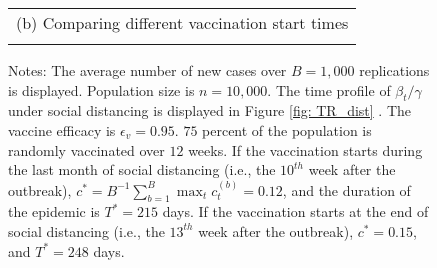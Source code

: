 \documentclass[12pt]{article}
\begin{document}
\begin{figure}[tp]
\begin{footnotesize}
\vspace{0.3cm}%


\begin{center}%
\begin{tabular}
[c]{c}%
(b) Comparing different vaccination start times%
\vspace{0.2cm}%
\\%
{\includegraphics[
height=1.9951in,
width=2.6524in
]%
{figs/theory_cmp_vacc_wbeg_dist_pct75_eff95_12W_dcT.png}%
}
\end{tabular}



\end{center}

%

\vspace{-0.2cm}%
Notes: The average number of new cases over $B=1,000$ replications is
displayed. Population size is $n=10,000$. The time profile of $\beta
_{t}/\gamma$ under social distancing is displayed in Figure \ref{fig: TR_dist}%
. The vaccine efficacy is $\epsilon_{v}=0.95$. $75$ percent of the population
is randomly vaccinated over $12$ weeks. If the vaccination starts during the
last month of social distancing (i.e., the $10^{th}$ week after the outbreak),
$c^{\ast}=B^{-1}\sum_{b=1}^{B}\max_{t}c_{t}^{(b)}=0.12$, and the duration of
the epidemic is $T^{\ast}=215$ days. If the vaccination starts at the end of
social distancing (i.e., the $13^{th}$ week after the outbreak), $c^{\ast
}=0.15$, and $T^{\ast}=248$ days.%

\end{footnotesize}%
%

\end{figure}%
%
\end{document}

